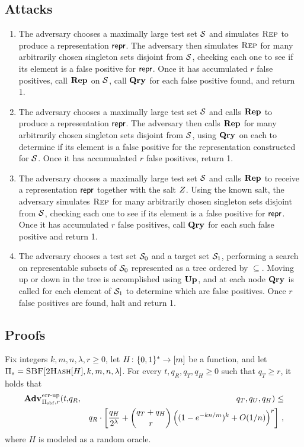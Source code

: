 \subsection{Attacks}

\begin{enumerate}
 \item The adversary chooses a maximally large test set $\mathcal{S}$ and simulates $\textsc{Rep}$ to produce a representation $\mathsf{repr}$. The adversary then simulates $\textsc{Rep}$ for many arbitrarily chosen singleton sets disjoint from $\mathcal{S}$, checking each one to see if its element is a false positive for $\mathsf{repr}$. Once it has accumulated $r$ false positives, call $\mathbf{Rep}\hspace{0.5pt}$ on $\mathcal{S}$, call $\mathbf{Qry}\hspace{0.5pt}$ for each false positive found, and return 1.
 \item The adversary chooses a maximally large test set $\mathcal{S}$ and calls $\mathbf{Rep}\hspace{0.5pt}$ to produce a representation $\mathsf{repr}$. The adversary then calls $\mathbf{Rep}\hspace{0.5pt}$ for many arbitrarily chosen singleton sets disjoint from $\mathcal{S}$, using $\mathbf{Qry}\hspace{0.5pt}$ on each to determine if its element is a false positive for the representation constructed for $\mathcal{S}$. Once it has accumualated $r$ false positives, return 1.
 \item The adversary chooses a maximally large test set $\mathcal{S}$ and calls $\mathbf{Rep}\hspace{0.5pt}$ to receive a representation $\mathsf{repr}$ together with the salt $Z$. Using the known salt, the adversary simulates $\textsc{Rep}$ for many arbitrarily chosen singleton sets disjoint from $\mathcal{S}$, checking each one to see if its element is a false positive for $\mathsf{repr}$. Once it has accumulated $r$ false positives, call $\mathbf{Qry}\hspace{0.5pt}$ for each such false positive and return 1.
 \item The adversary chooses a test set $\mathcal{S}_0$ and a target set $\mathcal{S}_1$, performing a search on representable subsets of $\mathcal{S}_0$ represented as a tree ordered by $\subseteq$. Moving up or down in the tree is accomplished using $\mathbf{Up}\hspace{0.5pt}$, and at each node $\mathbf{Qry}\hspace{0.5pt}$ is called for each element of $\mathcal{S}_1$ to determine which are false positives. Once $r$ false positives are found, halt and return 1.
\end{enumerate}

\subsection{Proofs}

\begin{theorem}\label{thm:bf-salt-bound}
Fix integers $k, m, n, \lambda, r\geq 0$, let $H \colon \{0,1\}^* \to [m]$ be a function, and let $\mathrm{\Pi}_s = \textsc{SBF}[\textsc{2Hash}[H],k,m,n,\lambda]$.
  For every $t, q_R, q_T, q_H \geq 0$ such that $q_T \geq r$, it holds that
  \begin{eqnarray*}
    \Adv{\errep}_{\struct_\saltybloom,r}(t,&q_R,& q_T, q_U, q_H) \leq \\ && q_R \cdot
     \left[
      \frac{q_H}{2^\lambda} +
      {\dbinom{q_T + q_H}{r}} \left( (1-e^{-kn/m})^k + O(1/n) \right)^r
    \right] \,,
\end{eqnarray*}
where $H$ is modeled as a random oracle.
\end{theorem}

